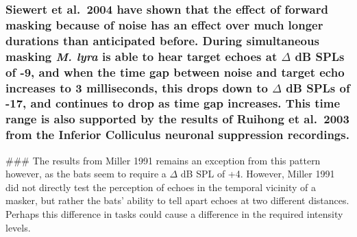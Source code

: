 \documentclass[11pt]{article}
\begin{document}
\begin{itemize}
  \hypertarget{siewert-et-al.2004-have-shown-that-the-effect-of-forward-masking-because-of-noise-has-an-effect-over-much-longer-durations-than-anticipated-before.-during-simultaneous-masking-m.-lyra-is-able-to-hear-target-echoes-at-delta-db-spls-of--9-and-when-the-time-gap-between-noise-and-target-echo-increases-to-3-milliseconds-this-drops-down-to-delta-db-spls-of--17-and-continues-to-drop-as-time-gap-increases.-this-time-range-is-also-supported-by-the-results-of-ruihong-et-al.2003-from-the-inferior-colliculus-neuronal-suppression-recordings.}{%
  \subsubsection{\texorpdfstring{Siewert et al.~2004 have shown that the
  effect of forward masking because of noise has an effect over much
  longer durations than anticipated before. During simultaneous masking
  \emph{M. lyra} is able to hear target echoes at \(\Delta\) dB SPLs of
  -9, and when the time gap between noise and target echo increases to 3
  milliseconds, this drops down to \(\Delta\) dB SPLs of -17, and
  continues to drop as time gap increases. This time range is also
  supported by the results of Ruihong et al.~2003 from the Inferior
  Colliculus neuronal suppression
  recordings.}{Siewert et al.~2004 have shown that the effect of forward masking because of noise has an effect over much longer durations than anticipated before. During simultaneous masking M. lyra is able to hear target echoes at \textbackslash{}Delta dB SPLs of -9, and when the time gap between noise and target echo increases to 3 milliseconds, this drops down to \textbackslash{}Delta dB SPLs of -17, and continues to drop as time gap increases. This time range is also supported by the results of Ruihong et al.~2003 from the Inferior Colliculus neuronal suppression recordings.}}\label{siewert-et-al.2004-have-shown-that-the-effect-of-forward-masking-because-of-noise-has-an-effect-over-much-longer-durations-than-anticipated-before.-during-simultaneous-masking-m.-lyra-is-able-to-hear-target-echoes-at-delta-db-spls-of--9-and-when-the-time-gap-between-noise-and-target-echo-increases-to-3-milliseconds-this-drops-down-to-delta-db-spls-of--17-and-continues-to-drop-as-time-gap-increases.-this-time-range-is-also-supported-by-the-results-of-ruihong-et-al.2003-from-the-inferior-colliculus-neuronal-suppression-recordings.}}
\end{itemize}

\#\#\# The results from Miller 1991 remains an exception from this
pattern however, as the bats seem to require a \(\Delta\) dB SPL of +4.
However, Miller 1991 did not directly test the perception of echoes in
the temporal vicinity of a masker, but rather the bats' ability to tell
apart echoes at two different distances. Perhaps this difference in
tasks could cause a difference in the required intensity levels.
\end{document}
